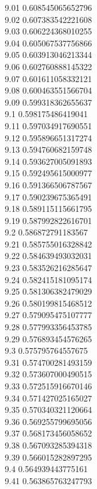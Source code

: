 {9.01	0.608545065652796\\
9.02	0.607383542221608\\
9.03	0.606224368010255\\
9.04	0.605067537756866\\
9.05	0.603913046213344\\
9.06	0.602760888145322\\
9.07	0.601611058332121\\
9.08	0.600463551566704\\
9.09	0.599318362655637\\
9.1	0.598175486419041\\
9.11	0.597034917690551\\
9.12	0.595896651317274\\
9.13	0.594760682159748\\
9.14	0.593627005091893\\
9.15	0.592495615000977\\
9.16	0.591366506787567\\
9.17	0.590239675365491\\
9.18	0.589115115661795\\
9.19	0.587992822616701\\
9.2	0.586872791183567\\
9.21	0.585755016328842\\
9.22	0.584639493032031\\
9.23	0.583526216285647\\
9.24	0.582415181095174\\
9.25	0.581306382479029\\
9.26	0.580199815468512\\
9.27	0.579095475107777\\
9.28	0.577993356453785\\
9.29	0.576893454576265\\
9.3	0.575795764557675\\
9.31	0.574700281493159\\
9.32	0.573607000490515\\
9.33	0.572515916670146\\
9.34	0.571427025165027\\
9.35	0.570340321120664\\
9.36	0.569255799695056\\
9.37	0.568173456058652\\
9.38	0.567093285394318\\
9.39	0.566015282897295\\
9.4	0.564939443775161\\
9.41	0.563865763247793\\
}
